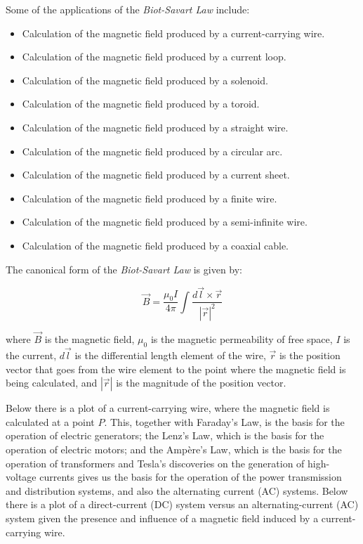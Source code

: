 \documentclass[10pt]{article}
\begin{document}
{	Some of the applications of the \emph{Biot-Savart Law} include:
	\begin{itemize}
		\item Calculation of the magnetic field produced by a current-carrying wire.

		\item Calculation of the magnetic field produced by a current loop.

		\item Calculation of the magnetic field produced by a solenoid.

		\item Calculation of the magnetic field produced by a toroid.

		\item Calculation of the magnetic field produced by a straight wire.

		\item Calculation of the magnetic field produced by a circular arc.

		\item Calculation of the magnetic field produced by a current sheet.

		\item Calculation of the magnetic field produced by a finite wire.

		\item Calculation of the magnetic field produced by a semi-infinite wire.

		\item Calculation of the magnetic field produced by a coaxial cable.
	\end{itemize}

	The canonical form of the \emph{Biot-Savart Law} is given by:

	\begin{equation}
		\vec{B}= \frac{\mu_{0} I}{4\pi}\int \frac{d \vec{l} \times \vec{r}}{|\vec{r}|^{2}}
	\end{equation}

	where $\vec{B}$ is the magnetic field, $\mu_{0}$ is the magnetic permeability of
	free space, $I$ is the current, $d \vec{l}$ is the differential length element
	of the wire, $\vec{r}$ is the position vector that goes from the wire element
	to the point where the magnetic field is being calculated, and $|\vec{r}|$ is the
	magnitude of the position vector.

	Below there is a plot of a current-carrying wire, where the magnetic field is
	calculated at a point $P$. This, together with Faraday's Law, is the basis for
	the operation of electric generators; the Lenz's Law, which is the basis for the
	operation of electric motors; and the Ampère's Law, which is the basis for the
	operation of transformers and Tesla's discoveries on the generation of high-voltage
	currents gives us the basis for the operation of the power transmission and distribution
	systems, and also the alternating current (AC) systems. Below there is a plot of
	a direct-current (DC) system versus an alternating-current (AC) system given the
	presence and influence of a magnetic field induced by a current-carrying wire.

}
\end{document}
